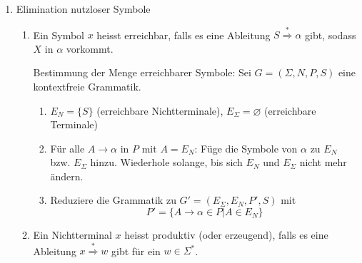 \documentclass[11pt]{article} %
\theoremstyle{definition}
\newtheorem*{beispiel}{Beispiel}
\begin{document}
\begin{enumerate}[(1)]
\begin{proof}[Beweis]
\begin{enumerate}
\end{enumerate}

Daraus ergibt sich die Sprache $G' = (\Sigma, N, P_2, S)$.

\end{proof}

\begin{beispiel}
Betrachte $G = (\{a,b,c\}, \{S,A,B,C\}, P, S)$ mit $P = \{ S \rightarrow AB, S \rightarrow C, A \rightarrow aB, a \rightarrow \varepsilon, B \rightarrow bA, B \rightarrow \varepsilon, C = c \}$.
\begin{enumerate}
\item $N_1 = \{A, B\}$
\item Wegen $S \rightarrow AB$ und $A,B \in N_1$ folgt $N_1 \leftarrow N_1 \cup \{S \}$. $\Rightarrow N_1 = \{A,B,S\}$.
\item $P_1 \leftarrow P \cup \{ S \rightarrow B, S \rightarrow A, A \rightarrow a, B \rightarrow b \}$.
\item $P_2 \leftarrow P_1 - \{A \rightarrow \varepsilon, B \rightarrow \varepsilon\}$
\end{enumerate}
\end{beispiel}

\item Elimination nutzloser Symbole

\begin{enumerate}
\item Ein Symbol $x$ heisst erreichbar, falls es eine Ableitung $S \overset{*}{\Rightarrow} \alpha$ gibt, sodass $X$ in $\alpha$ vorkommt.

Bestimmung der Menge erreichbarer Symbole: Sei $G = (\Sigma, N, P, S)$ eine kontextfreie Grammatik.
\begin{enumerate}
\item $E_N = \{ S \}$ (erreichbare Nichtterminale), $E_\Sigma = \varnothing$ (erreichbare Terminale)
\item Für alle $A \rightarrow \alpha$ in $P$ mit $A = E_N$: Füge die Symbole von $\alpha$  zu $E_N$ bzw. $E_\Sigma$ hinzu. Wiederhole solange, bis sich $E_N$ und $E_\Sigma$ nicht mehr ändern.
\item Reduziere die Grammatik zu $G' = (E_\Sigma, E_N, P', S)$ mit
\[
P' = \{A \rightarrow \alpha \in P | A \in E_N \}
\]
\end{enumerate}

\item Ein Nichtterminal $x$ heisst produktiv (oder erzeugend), falls es eine Ableitung $x \overset{*}{\Rightarrow} w$ gibt für ein $w \in \Sigma^*$.


\end{enumerate}
\end{enumerate}
\end{document}
